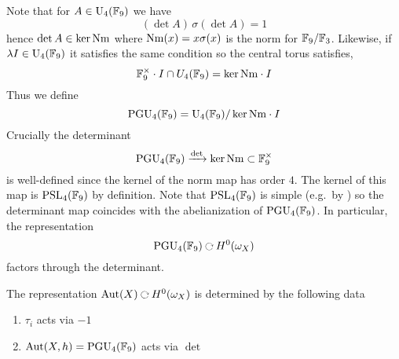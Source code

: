 \documentclass[12pt]{article}
\begin{document}
Note that for $A \in \mathrm{U}_4(\mathbb{F}_9)$ we have
\[ (\det{A}) \, \sigma(\det{A}) = 1 \]
hence $\det{A} \in \ker{\mathrm{Nm}}$ where $\mathrm{Nm}(x) = x \sigma(x)$ is the norm for $\mathbb{F}_9 / \mathbb{F}_3$. Likewise, if $\lambda I \in \mathrm{U}_4(\mathbb{F}_9)$ it satisfies the same condition so the central torus satisfies,
\[ \mathbb{F}_9^\times \cdot I \cap U_4(\mathbb{F}_9) = \ker{\mathrm{Nm}} \cdot I \]
Thus we define
\[ \mathrm{PGU}_4(\mathbb{F}_9) = \mathrm{U}_4(\mathbb{F}_9) / \ker{\mathrm{Nm}} \cdot I \]
Crucially the determinant
\[ \mathrm{PGU}_4(\mathbb{F}_9) \xrightarrow{\det} \ker{\mathrm{Nm}} \subset \mathbb{F}_9^\times \]
is well-defined since the kernel of the norm map has order $4$. The kernel of this map is $\mathrm{PSL}_4(\mathbb{F}_9)$ by definition. Note that $\mathrm{PSL}_4(\mathbb{F}_9)$ is simple (e.g.\ by ) so the determinant map coincides with the abelianization of $\mathrm{PGU}_4(\mathbb{F}_9)$. In particular, the representation
\[ \PGU_4(\FF_9) \acts H^0(\omega_X) \]
factors through the determinant.

\begin{prop}
The representation $\Aut(X) \acts H^0(\omega_X)$ is determined by the following data
\begin{enumerate}
\item $\tau_i$ acts via $-1$
\item $\mathrm{Aut}(X,h) = \mathrm{PGU}_4(\mathbb{F}_9)$ acts via $\det$
\end{enumerate}
\end{prop}
\end{document}
